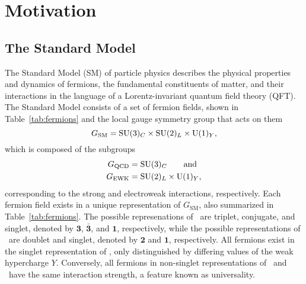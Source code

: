 \chapter{Motivation}


\section{The Standard Model}
\label{sec:sm}

The Standard Model (SM) of particle physics describes the physical properties and dynamics of fermions, the fundamental constituents of matter, and their interactions in the language of a Lorentz-invariant quantum field theory (QFT).
The Standard Model consists of a set of fermion fields, shown in Table~\ref{tab:fermions} and the local gauge symmetry group that acts on them
\begin{equation}
  G_{\text{SM}} = \text{SU}(3)_C \times \text{SU}(2)_L \times \text{U}(1)_Y,
\end{equation}
which is composed of the subgroups
\begin{align}
  G_{\text{QCD}} & = \text{SU}(3)_C \qquad \text{and} \nonumber \\
  G_{\text{EWK}} & = \text{SU}(2)_L \times \text{U}(1)_Y,
\end{align}
corresponding to the strong and electroweak interactions, respectively.
Each fermion field exists in a unique representation of $G_{\text{SM}}$, also summarized in Table~\ref{tab:fermions}.
The possible represenations of \suthree\ are triplet, conjugate, and singlet, denoted by $\mathbf{3}$, $\mathbf{\bar{3}}$, and $\mathbf{1}$, respectively, while the possible representations of \sutwo\ are doublet and singlet, denoted by $\mathbf{2}$ and $\mathbf{1}$, respectively.
All fermions exist in the singlet representation of \uone, only distinguished by differing values of the weak hypercharge $Y$.
Conversely, all fermions in non-singlet representations of \suthree\ and \sutwo\ have the same interaction strength, a feature known as universality.

